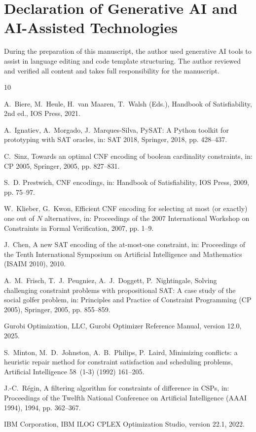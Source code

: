\documentclass[a4paper,fleqn]{cas-sc}
\begin{document}
\section*{Declaration of Generative AI and AI-Assisted Technologies}
During the preparation of this manuscript, the author used generative AI tools to assist in language editing and code template structuring. The author reviewed and verified all content and takes full responsibility for the manuscript.

\begin{thebibliography}{10}

A.~Biere, M.~Heule, H.~van Maaren, T.~Walsh (Eds.), Handbook of Satisfiability, 2nd ed., IOS Press, 2021.

A.~Ignatiev, A.~Morgado, J.~Marques-Silva, PySAT: A Python toolkit for prototyping with SAT oracles, in: SAT 2018, Springer, 2018, pp. 428--437.

C.~Sinz, Towards an optimal CNF encoding of boolean cardinality constraints, in: CP 2005, Springer, 2005, pp. 827--831.

S.~D. Prestwich, CNF encodings, in: Handbook of Satisfiability, IOS Press, 2009, pp. 75--97.

W.~Klieber, G.~Kwon, Efficient {CNF} encoding for selecting at most (or exactly) one out of {$N$} alternatives, in: Proceedings of the 2007 International Workshop on Constraints in Formal Verification, 2007, pp. 1--9.

J.~Chen, A new {SAT} encoding of the at-most-one constraint, in: Proceedings of the Tenth International Symposium on Artificial Intelligence and Mathematics (ISAIM 2010), 2010.

A.~M.~Frisch, T.~J.~Peugniez, A.~J.~Doggett, P.~Nightingale, Solving challenging constraint problems with propositional {SAT}: A case study of the social golfer problem, in: Principles and Practice of Constraint Programming (CP 2005), Springer, 2005, pp. 855--859.

Gurobi Optimization, LLC, Gurobi Optimizer Reference Manual, version 12.0, 2025.

S.~Minton, M.~D.~Johnston, A.~B.~Philips, P.~Laird, Minimizing conflicts: a heuristic repair method for constraint satisfaction and scheduling problems, Artificial Intelligence 58~(1-3) (1992) 161--205.

J.-C.~R{\'e}gin, A filtering algorithm for constraints of difference in {CSPs}, in: Proceedings of the Twelfth National Conference on Artificial Intelligence (AAAI 1994), 1994, pp. 362--367.

IBM Corporation, IBM ILOG CPLEX Optimization Studio, version 22.1, 2022.

\end{thebibliography}
\end{document}
